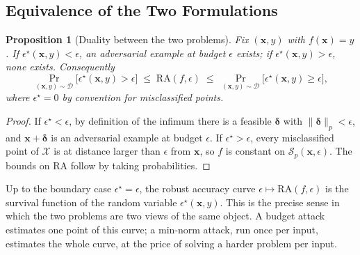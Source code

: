 \documentclass[10pt,a4paper]{extarticle}
\newtheorem{proposition}[theorem]{Proposition}
\theoremstyle{definition}
\newcommand{\X}{\mathcal{X}}
\newcommand{\D}{\mathcal{D}}
\newcommand{\x}{\mathbf{x}}
\newcommand{\bdelta}{\boldsymbol{\delta}}
\begin{document}
\subsection{Equivalence of the Two Formulations}\label{sec:equiv}

\begin{proposition}[Duality between the two problems]\label{prop:duality}
Fix \((\x,y)\) with \(f(\x)=y\). If \(\epsilon^\star(\x,y)<\epsilon\), an adversarial example at budget \(\epsilon\) exists; if \(\epsilon^\star(\x,y)>\epsilon\), none exists. Consequently
\[
\Pr_{(\x,y)\sim\D}\big[\epsilon^\star(\x,y)>\epsilon\big]\;\le\;\mathrm{RA}(f,\epsilon)\;\le\;\Pr_{(\x,y)\sim\D}\big[\epsilon^\star(\x,y)\ge\epsilon\big],
\]
where \(\epsilon^\star=0\) by convention for misclassified points.
\end{proposition}

\begin{proof}
If \(\epsilon^\star<\epsilon\), by definition of the infimum there is a feasible \(\bdelta\) with \(\|\bdelta\|_p<\epsilon\), and \(\x+\bdelta\) is an adversarial example at budget \(\epsilon\). If \(\epsilon^\star>\epsilon\), every misclassified point of \(\X\) is at distance larger than \(\epsilon\) from \(\x\), so \(f\) is constant on \(\mathcal{S}_p(\x,\epsilon)\). The bounds on \(\mathrm{RA}\) follow by taking probabilities.
\end{proof}

Up to the boundary case \(\epsilon^\star=\epsilon\), the robust accuracy curve \(\epsilon\mapsto\mathrm{RA}(f,\epsilon)\) is the survival function of the random variable \(\epsilon^\star(\x,y)\). This is the precise sense in which the two problems are two views of the same object. A budget attack estimates one point of this curve; a min-norm attack, run once per input, estimates the whole curve, at the price of solving a harder problem per input.
\end{document}

